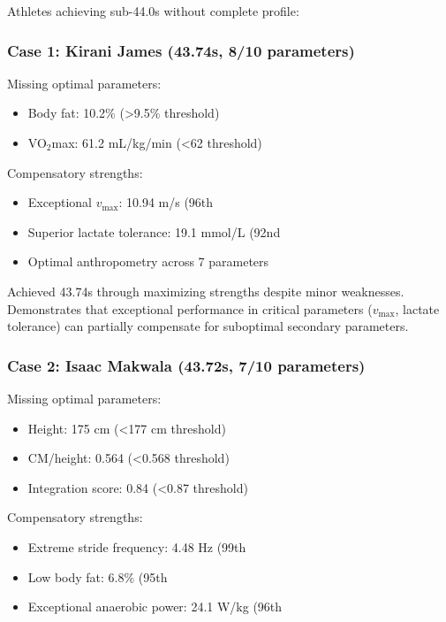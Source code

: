 Athletes achieving sub-44.0s without complete profile:

\subsubsection{Case 1: Kirani James (43.74s, 8/10 parameters)}

Missing optimal parameters:
\begin{itemize}
    \item Body fat: 10.2\% (>9.5\% threshold)
    \item VO$_2$max: 61.2 mL/kg/min (<62 threshold)
\end{itemize}

Compensatory strengths:
\begin{itemize}
    \item Exceptional $v_{\max}$: 10.94 m/s (96th %
    \item Superior lactate tolerance: 19.1 mmol/L (92nd %
    \item Optimal anthropometry across 7 parameters
\end{itemize}

Achieved 43.74s through maximizing strengths despite minor weaknesses. Demonstrates that exceptional performance in critical parameters ($v_{\max}$, lactate tolerance) can partially compensate for suboptimal secondary parameters.

\subsubsection{Case 2: Isaac Makwala (43.72s, 7/10 parameters)}

Missing optimal parameters:
\begin{itemize}
    \item Height: 175 cm (<177 cm threshold)
    \item CM/height: 0.564 (<0.568 threshold)
    \item Integration score: 0.84 (<0.87 threshold)
\end{itemize}

Compensatory strengths:
\begin{itemize}
    \item Extreme stride frequency: 4.48 Hz (99th %
    \item Low body fat: 6.8\% (95th %
    \item Exceptional anaerobic power: 24.1 W/kg (96th %
\end{itemize}

